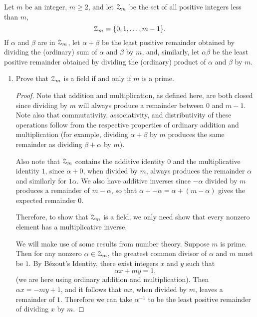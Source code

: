  Let $m$ be an integer, $m\geq2$, and let $\mathcal{Z}_m$ be the set
of all positive integers less than $m$,
\begin{equation*}
  \mathcal{Z}_m = \{0,1,\dots,m-1\}.
\end{equation*}
If $\alpha$ and $\beta$ are in $\mathcal{Z}_m$, let $\alpha + \beta$ be the
least positive remainder obtained by dividing the (ordinary) sum of
$\alpha$ and $\beta$ by $m$, and, similarly, let $\alpha\beta$ be the
least positive remainder obtained by dividing the (ordinary) product
of $\alpha$ and $\beta$ by $m$.
\label{exercise:the-field-Zp}
\begin{enumerate}
\item Prove that $\mathcal{Z}_m$ is a field if and only if $m$ is a prime.
  \begin{proof}
    Note that addition and multiplication, as defined here, are both
    closed since dividing by $m$ will always produce a remainder
    between $0$ and $m - 1$. Note also that commutativity,
    associativity, and distributivity of these operations follow from
    the respective properties of ordinary addition and multiplication
    (for example, dividing $\alpha + \beta$ by $m$ produces the same
    remainder as dividing $\beta + \alpha$ by $m$).

    Also note that $\mathcal{Z}_m$ contains the additive identity $0$ and the
    multiplicative identity $1$, since $\alpha + 0$, when divided by
    $m$, always produces the remainder $\alpha$ and similarly for
    $1\alpha$. We also have additive inverses since $-\alpha$ divided
    by $m$ produces a remainder of $m - \alpha$, so that
    $\alpha + -\alpha = \alpha + (m - \alpha)$ gives the expected
    remainder $0$.

    Therefore, to show that $\mathcal{Z}_m$ is a field, we only need show that
    every nonzero element has a multiplicative inverse.

    We will make use of some results from number theory. Suppose $m$
    is prime. Then for any nonzero $\alpha\in\mathcal{Z}_m$, the greatest
    common divisor of $\alpha$ and $m$ must be $1$. By B\'ezout's
    Identity, there exist integers $x$ and $y$ such that
    \begin{equation*}
      \alpha x + my = 1,
    \end{equation*}
    (we are here using ordinary addition and multiplication). Then
    $\alpha x = -my + 1$, and it follows that $\alpha x$, when divided
    by $m$, leaves a remainder of $1$. Therefore we can take
    $\alpha^{-1}$ to be the least positive remainder of dividing $x$
    by $m$.


\end{proof}
\end{enumerate}
